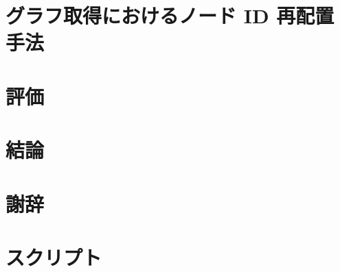 \documentclass[12pt]{b-thesis}
\begin{document}
\chapter{グラフ取得におけるノード ID 再配置手法}
\label{chap:design}


\begin{comment}
\chapter{プロトコル詳細}
\label{chap:protocol}

\end{comment}

\begin{comment}
\chapter{実装}
\label{chap:implementation}

\end{comment}

\chapter{評価}
\label{chap:evaluation}


\chapter{結論}
\label{chap:conclusion}


\label{chap:thanks}
\chapter*{謝辞}


\thispagestyle{plain}



\appendix
\def\thechapter{付録\Alph{chapter}}
\chapter{スクリプト}
\label{chap:appendix}
\def\thechapter{\Alph{chapter}}

\end{document}
